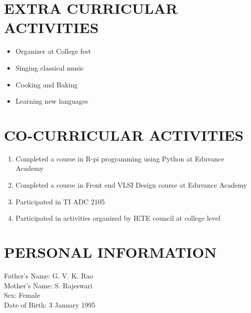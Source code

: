 \documentclass[line, margin]{res}
\begin{document}
\begin{resume}
\section{\bf EXTRA CURRICULAR ACTIVITIES}
\begin{itemize}
	\item Organizer at College fest  
	\item Singing classical music
	\item Cooking and Baking
	\item Learning new languages
\end{itemize}

\section{\bf CO-CURRICULAR ACTIVITIES}
\begin{enumerate}
	\item Completed a course in R-pi programming using Python at Eduvance Academy
	\item Completed a course in Front end VLSI Design course at Eduvance Academy
	\item Participated in TI ADC 2105
	\item Participated in activities organized by IETE council at college level
\end{enumerate}

\section{\bf PERSONAL INFORMATION}
Father's Name: G. V. K. Rao \\
Mother's Name: S. Rajeswari \\
Sex: Female \\
Date  of Birth: 3 January 1995 \\

\end{resume}
\end{document}
